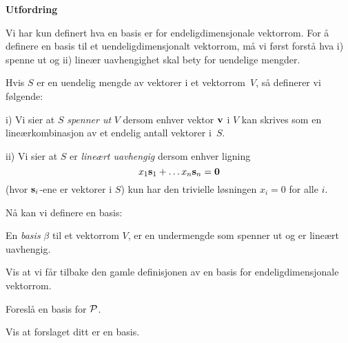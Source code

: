 \begin{oppgave} \textbf{Utfordring}

\noindent
Vi har kun definert hva en basis er for endeligdimensjonale
vektorrom. For å definere en basis til et
uendeligdimensjonalt vektorrom, må vi først forstå hva i) spenne ut
og ii) lineær uavhengighet skal bety for uendelige mengder.

\smallskip
\noindent
Hvis $S$ er en uendelig mengde av vektorer i et vektorrom~$V$,
så definerer vi følgende:

\noindent
i) Vi sier at $S$ \emph{spenner ut} $V$ dersom enhver vektor $\V{v}$ i
$V$ kan skrives som en lineærkombinasjon av et endelig antall vektorer
i~$S$.

\noindent
ii) Vi sier at $S$ er \emph{lineært uavhengig} dersom enhver
ligning
\[
x_1\V{s}_1+\dots x_n\V{s}_n=\V{0}
\]
(hvor $\V{s}_i$-ene er vektorer i $S$) kun har den trivielle løsningen
$x_i=0$ for alle $i$.

\smallskip
\noindent
Nå kan vi definere en basis:

\noindent
En \emph{basis} $\beta$ til et vektorrom $V$, er en undermengde som spenner ut og er lineært uavhengig.

\begin{punkt}
Vis at vi får tilbake den gamle definisjonen av en basis for endeligdimensjonale vektorrom.
\end{punkt}

\begin{punkt}
Foreslå en basis for $\P$.
\end{punkt}

\begin{punkt}
Vis at forslaget ditt er en basis.
\end{punkt}

\end{oppgave}


